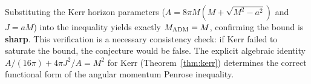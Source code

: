 \begin{remark}
Substituting the Kerr horizon parameters ($A = 8\pi M(M + \sqrt{M^2 - a^2})$ and $J = aM$) into the inequality yields exactly $M_{\mathrm{ADM}} = M$, confirming the bound is \textbf{sharp}. This verification is a necessary consistency check: if Kerr failed to saturate the bound, the conjecture would be false. The explicit algebraic identity $A/(16\pi) + 4\pi J^2/A = M^2$ for Kerr (Theorem~\ref{thm:kerr}) determines the correct functional form of the angular momentum Penrose inequality.
\end{remark}


